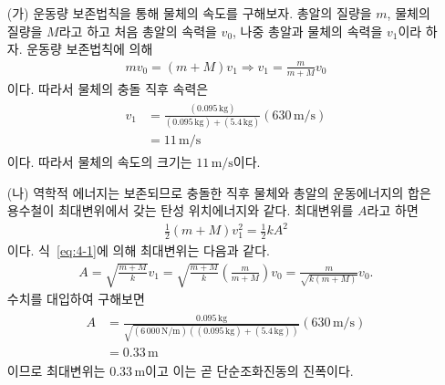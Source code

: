 \documentclass[floatfix,nofootinbib,superscriptaddress,fleqn]{revtex4-2}
\begin{document}
\begin{itemize}
  \item[(가)] 운동량 보존법칙을 통해 물체의 속도를 구해보자.
  총알의 질량을 $m$, 물체의 질량을 $M$라고 하고 처음 총알의 속력을 $v_0$,
  나중 총알과 물체의 속력을 $v_1$이라 하자. 운동량 보존법칙에 의해
  \begin{align}\label{eq:4-1}
    mv_0 = (m+M)v_1\Longrightarrow v_1 = \frac{m}{m+M}v_0
  \end{align}
  이다. 따라서 물체의 충돌 직후 속력은 
  \begin{align}
  \begin{split}
    v_1 &= \frac{(0.095\,\mathrm{kg})}
    {(0.095\,\mathrm{kg})+(5.4\,\mathrm{kg})}(630\,\mathrm{m/s})  \\
    &= 11\,\mathrm{m/s}
  \end{split}
  \end{align}
  이다. 따라서 물체의 속도의 크기는 $11\,\mathrm{m/s}$이다.
  \item[(나)] 역학적 에너지는 보존되므로 충돌한 직후 물체와 총알의 운동에너지의 합은 
  용수철이 최대변위에서 갖는 탄성 위치에너지와 같다. 최대변위를 $A$라고 하면
  \begin{align}
    \frac{1}{2}(m+M)v_1^2 = \frac{1}{2}kA^2
  \end{align}
  이다. 식~\eqref{eq:4-1}에 의해 최대변위는 다음과 같다.
  \begin{align}
    A = \sqrt{\frac{m+M}{k}}v_1 = \sqrt{\frac{m+M}{k}}\left(\frac{m}{m+M}\right)v_0
    =\frac{m}{\sqrt{k(m+M)}}v_0.
  \end{align}
  수치를 대입하여 구해보면
  \begin{align}
    \begin{split}
      A &= \frac{0.095\,\mathrm{kg}}{\sqrt{(6\,000\,\mathrm{N/m})((0.095\,\mathrm{kg})
      +(5.4\,\mathrm{kg}))}}(630\,\mathrm{m/s})  \\
      &= 0.33\,\mathrm{m}
    \end{split}
  \end{align}
  이므로 최대변위는 $ 0.33\,\mathrm{m}$이고 이는 곧 단순조화진동의 진폭이다.
\end{itemize}

 
\end{document}
